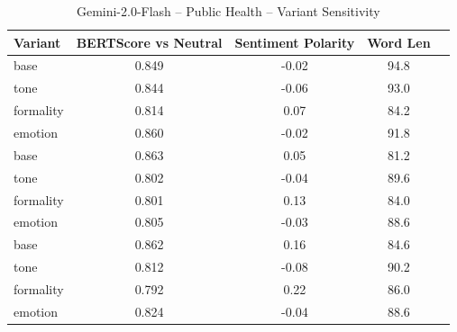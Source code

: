 \documentclass[12pt,a4paper]{article}
\begin{document}
\begin{table}[h]
\centering
\caption{Gemini-2.0-Flash – Public Health – Variant Sensitivity}
\label{tab:Gemini-2.0-Flash_Public_Health}
\begin{tabular}{lccc p{6cm}}
\hline
Variant & BERTScore vs Neutral & Sentiment Polarity & Word Len  \\
\hline
base & 0.849 & -0.02 & 94.8  \\
tone & 0.844 & -0.06 & 93.0  \\
formality & 0.814 & 0.07 & 84.2  \\
emotion & 0.860 & -0.02 & 91.8  \\
base & 0.863 & 0.05 & 81.2  \\
tone & 0.802 & -0.04 & 89.6  \\
formality & 0.801 & 0.13 & 84.0  \\
emotion & 0.805 & -0.03 & 88.6  \\
base & 0.862 & 0.16 & 84.6  \\
tone & 0.812 & -0.08 & 90.2  \\
formality & 0.792 & 0.22 & 86.0  \\
emotion & 0.824 & -0.04 & 88.6  \\
\hline
\end{tabular}
\end{table}
\end{document}
